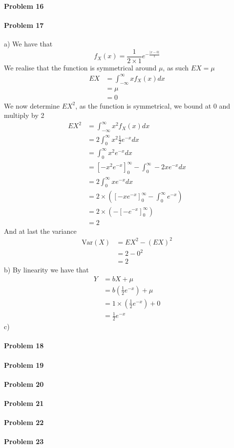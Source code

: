 \paragraph{Problem 16}
\paragraph{Problem 17}
a)
We have that
\[
    f_{X}(x)=\frac{1}{2\times 1}e^{-\frac{|x-0|}{1}}
\]
We realise that the function is symmetrical around $\mu$, as such $EX=\mu$
\begin{align*}
    EX&=\int_{-\infty}^{\infty}xf_{X}(x)dx \\
      &=\mu \\
      &=0
\end{align*}
We now determine $EX^{2}$, as the function is symmetrical, we bound at 0 and multiply by 2
\begin{align*}
    EX^{2}&=\int_{-\infty}^{\infty}x^{2}f_{X}(x)dx \\
      &=2\int_{0}^{\infty}x^{2}\frac{1}{2}e^{-x}dx \\
      &=\int_{0}^{\infty}x^{2}e^{-x}dx \\
      &=\left[-x^{2}e^{-x}\right]_{0}^{\infty}-\int_{0}^{\infty}-2xe^{-x}dx \\
      &=2\int_{0}^{\infty}xe^{-x}dx \\
      &=2\times\left(\left[-xe^{-x}\right]_{0}^{\infty}-\int_{0}^{\infty}e^{-x}\right) \\
      &=2\times\left(-\left[-e^{-x}\right]_{0}^{\infty}\right) \\
      &=2
\end{align*}
And at last the variance
\begin{align*}
    \text{Var}(X)&=EX^{2}-(EX)^{2} \\
             &=2-0^{2} \\
             &=2
\end{align*}
b)
By linearity we have that
\begin{align*}
    Y&=bX+\mu \\
     &=b\left(\frac{1}{2}e^{-x}\right)+\mu \\
     &=1\times\left(\frac{1}{2}e^{-x}\right)+0 \\
     &=\frac{1}{2}e^{-x}
\end{align*}
c)
\paragraph{Problem 18}
\paragraph{Problem 19}
\paragraph{Problem 20}
\paragraph{Problem 21}
\paragraph{Problem 22}
\paragraph{Problem 23}
